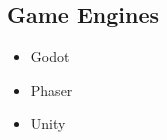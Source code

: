 \documentclass[letterpaper]{resume}
\begin{document}
\begin{minipage}[t]{0.27\textwidth}

\subsection{Game Engines}
\begin{itemize}
\item Godot
\item Phaser
\item Unity
\end{itemize}

\sectionspace %


\end{minipage} %
\hfill
%
%
\end{document}
